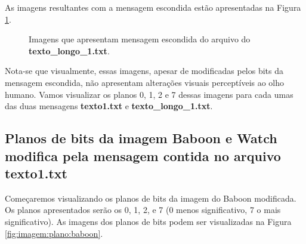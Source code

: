 \documentclass{article}
\begin{document}
\noindent
As imagens resultantes com a mensagem escondida estão apresentadas na Figura \ref{fig:imagem:saida2}.

\begin{figure}[htp]%
	\centering
	\qquad
	\caption{Imagens que apresentam mensagem escondida do arquivo do \textbf{texto\_longo\_1.txt}.}%
	\label{fig:imagem:saida2}%
\end{figure}


Nota-se que visualmente, essas imagens, apesar de modificadas pelos bits da mensagem escondida, não apresentam alterações visuais perceptíveis ao olho humano. Vamos visualizar os planos 0, 1, 2 e 7 dessas imagens para cada umas das duas mensagens \textbf{texto1.txt} e \textbf{texto\_longo\_1.txt}. 


\subsection{Planos de bits da imagem Baboon e Watch modifica pela mensagem contida no arquivo texto1.txt}

Começaremos visualizando os planos de bits da imagem do Baboon modificada. Os planos apresentados serão os 0, 1, 2, e 7 (0 menos significativo, 7 o mais significativo). As imagens dos planos de bits podem ser visualizadas na Figura \ref{fig:imagem:plano:baboon}.
\end{document}
